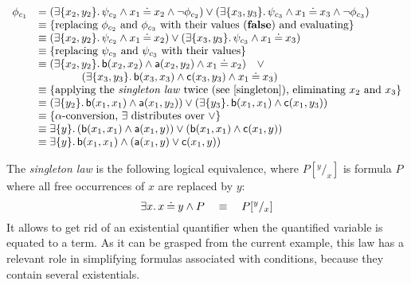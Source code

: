 \begin{example}
$
\begin{array}{ll}
 \phi_{c_{1}} & = (\exists \{x_{2},y_{2}\} \st \psi_{c_{2}} \land x_{1} \Eq x_{2} \land \neg \phi_{c_{2}}) \vee (\exists \{x_{3},y_{3}\} \st  \psi_{c_{3}} \land x_{1} \Eq x_{3} \land \neg \phi_{c_{3}})\\
  & \equiv \{\text{replacing $\phi_{c_{2}}$ and $\phi_{c_{3}}$ with their values ($\False$) and evaluating}\}\\
 & \equiv (\exists \{x_{2},y_{2}\} \st \psi_{c_{2}} \land x_{1} \Eq x_{2}) \vee (\exists \{x_{3},y_{3}\} \st  \psi_{c_{3}} \land x_{1} \Eq x_{3})\\
 & \equiv \{\text{replacing $\psi_{c_{2}}$ and $\psi_{c_{3}}$ with their values}\}\\
 & \equiv (\exists \{x_{2},y_{2}\} \st \lb(x_{2},x_{2})\land \la(x_{2},y_{2}) \land x_{1} \Eq x_{2})\quad \vee \\
 & \qquad \qquad (\exists \{x_{3},y_{3}\} \st  \lb(x_{3},x_{3})\land \lc(x_{3},y_{3}) \land x_{1} \Eq x_{3})\\
& \equiv \{\text{applying the \emph{singleton law} twice (see \eqref{singleton}), eliminating $x_2$ and $x_3$}\}\\
& \equiv (\exists \{y_{2}\} \st \lb(x_{1},x_{1})\land \la(x_{1},y_{2})) \lor (\exists \{y_{3}\} \st  \lb(x_{1},x_{1})\land \lc(x_{1},y_{3}))\\
& \equiv \{\text{$\alpha$-conversion, $\exists$ distributes over $\vee$}\}\\
& \equiv \exists \{y\} \st (\lb(x_{1},x_{1})\land \la(x_{1},y)) \lor ( \lb(x_{1},x_{1})\land \lc(x_{1},y))\\
& \equiv \exists \{y\} \st \lb(x_{1},x_{1})\land (\la(x_{1},y) \lor \lc(x_{1},y))\\
\end{array}
$

\medskip
The \emph{singleton law} is the following logical equivalence, where $P[^y/_x]$ is formula $P$ where all free occurrences of $x$ are replaced by $y$: 
\begin{equation}
\exists x.\, x \mathbin{\doteq} y \wedge P \quad \equiv \quad P[^y/_x] \label{eq:singleton}
\end{equation} 
It allows to get rid of an existential quantifier when the quantified variable is equated to a term. As it can be grasped from the current example, this law  has a relevant role in simplifying formulas associated with conditions, because they contain several existentials.


\end{example}
